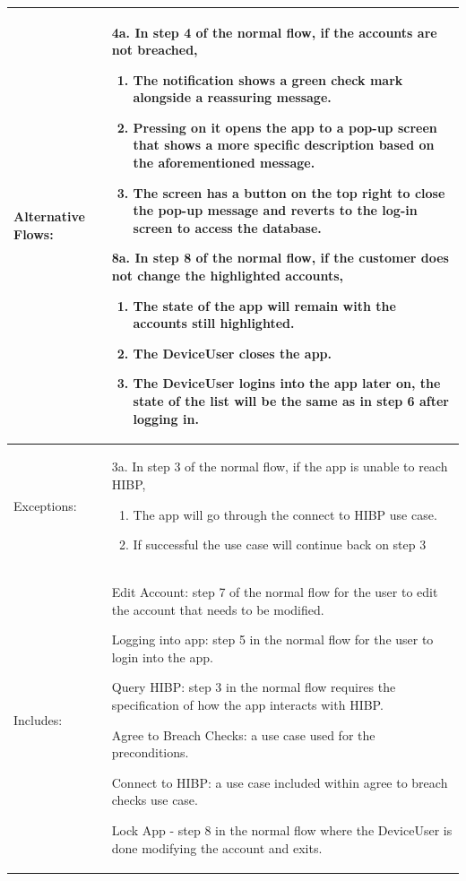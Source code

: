 \documentclass[stu]{apa7}
\newcommand{\nextitemblank}{\par\hspace*{\labelsep}\hspace*{\labelsep}}
\begin{document}
{\begin{xltabular}{\textwidth}{|l|X|}
  Alternative Flows: &
                       \nextitemblank 4a. In step 4 of the normal flow, if the accounts are not breached,
                       \begin{enumerate}
                         \item The notification shows a green check mark alongside a reassuring message.
                         \item Pressing on it opens the app to a pop-up screen that shows a more specific description based on the aforementioned message.
                         \item The screen has a button on the top right to close the pop-up message and reverts to the log-in screen to access the database.
                       \end{enumerate}
                       \nextitemblank  8a. In step 8 of the normal flow, if the customer does not change the highlighted accounts,
                       \begin{enumerate}
                         \item The state of the app will remain with the accounts still highlighted.
                         \item The DeviceUser closes the app.
                         \item The DeviceUser logins into the app later on, the state of the list will be the same as in step 6 after logging in.
                       \end{enumerate} \\ \hline

  Exceptions: &
                3a. In step 3 of the normal flow, if the app is unable to reach HIBP,
                \begin{enumerate}
                  \item The app will go through the connect to HIBP use case.
                  \item If successful the use case will continue back on step 3
                \end{enumerate} \\ \hline

  Includes: & \nextitemblank Edit Account: step 7 of the normal flow for the user to edit the account that needs to be modified.
              \nextitemblank Logging into app: step 5 in the normal flow for the user to login into the app.
              \nextitemblank Query HIBP: step 3 in the normal flow requires the specification of how the app interacts with HIBP.
              \nextitemblank Agree to Breach Checks: a use case used for the preconditions.
              \nextitemblank Connect to HIBP: a use case included within agree to breach checks use case.
              \nextitemblank Lock App - step 8 in the normal flow where the DeviceUser is done modifying the account and exits. \\ \hline


\end{xltabular}}
\end{document}
